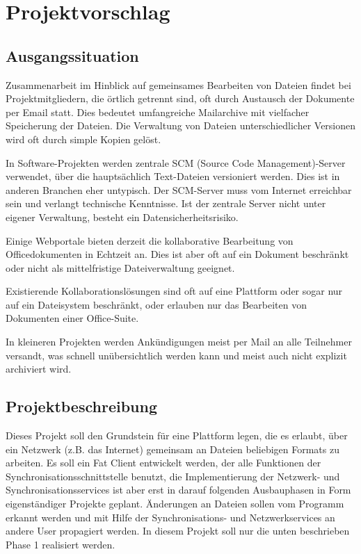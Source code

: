 \chapter{Projektvorschlag}
\thispagestyle{fancy}
\section{Ausgangssituation}
Zusammenarbeit im Hinblick auf gemeinsames Bearbeiten von Dateien findet bei Projektmitgliedern, die örtlich getrennt sind, oft durch Austausch der Dokumente per Email statt. Dies bedeutet umfangreiche Mailarchive mit vielfacher Speicherung der Dateien. Die Verwaltung von Dateien unterschiedlicher Versionen wird oft durch simple Kopien gelöst. 

In Software-Projekten werden zentrale SCM (Source Code Management)-Server verwendet, über die hauptsächlich Text-Dateien versioniert werden. Dies ist in anderen Branchen eher untypisch. Der SCM-Server muss vom Internet erreichbar sein und verlangt technische Kenntnisse. Ist der zentrale Server nicht unter eigener Verwaltung, besteht ein Datensicherheitsrisiko.

Einige Webportale bieten derzeit die kollaborative Bearbeitung von Officedokumenten in Echtzeit an. Dies ist aber oft auf ein Dokument beschränkt oder nicht als mittelfristige Dateiverwaltung geeignet.

Existierende Kollaborationslösungen sind oft auf eine Plattform oder sogar nur auf ein Dateisystem beschränkt, oder erlauben nur das Bearbeiten von Dokumenten einer Office-Suite.

In kleineren Projekten werden Ankündigungen meist per Mail an alle Teilnehmer versandt, was schnell unübersichtlich werden kann und meist auch nicht explizit archiviert wird.

\section{Projektbeschreibung}
Dieses Projekt soll den Grundstein für eine Plattform legen, die es erlaubt, über ein Netzwerk (z.B. das Internet) gemeinsam an Dateien beliebigen Formats zu arbeiten. Es soll ein Fat Client entwickelt werden, der alle Funktionen der Synchronisationsschnittstelle benutzt, die Implementierung der Netzwerk- und Synchronisationsservices ist aber erst in darauf folgenden Ausbauphasen in Form eigenständiger Projekte geplant. Änderungen an Dateien sollen vom Programm erkannt werden und mit Hilfe der Synchronisations- und Netzwerkservices an andere User propagiert werden. In diesem Projekt soll nur die unten beschrieben Phase 1 realisiert werden.

